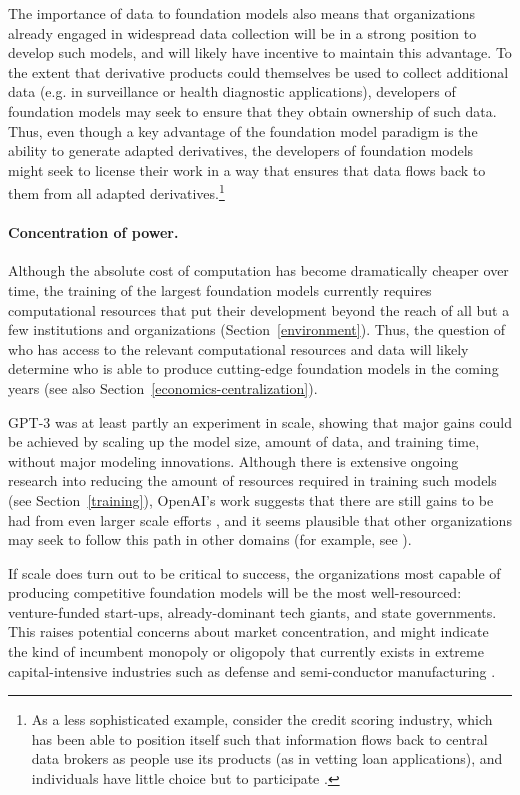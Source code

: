 The importance of data to foundation models also means that organizations already engaged in widespread data collection will be in a strong position to develop such models, and will likely have incentive to maintain this advantage. To the extent that derivative products could themselves be used to collect additional data (e.g. in surveillance or health diagnostic applications), developers of foundation models may seek to ensure that they obtain ownership of such data. Thus, even though a key advantage of the foundation model paradigm is the ability to generate adapted derivatives, the developers of foundation models might seek to license their work in a way that ensures that data flows back to them from all adapted derivatives.\footnote{As a less sophisticated example, consider the credit scoring industry, which has been able to position itself such that information flows back to central data brokers as people use its products (as in vetting loan applications), and individuals have little choice but to participate \citep{lauer.2017}.}

\paragraph{Concentration of power.} 

Although the absolute cost of computation has become dramatically cheaper over time, the training of the largest foundation models currently requires computational resources that put their development beyond the reach of all but a few institutions and organizations (Section~\ref{environment}). Thus, the question of who has access to the relevant computational resources and data will likely determine who is able to produce cutting-edge foundation models in the coming years (see also Section~\ref{economics-centralization}).

GPT-3 was at least partly an experiment in scale, showing that major gains could be achieved by scaling up the model size, amount of data, and training time, without major modeling innovations. Although there is extensive ongoing research into reducing the amount of resources required in training such models (see Section~\ref{training}), OpenAI's work suggests that there are still gains to be had from even larger scale efforts \citep{kaplan2020}, and it seems plausible that other organizations may seek to follow this path in other domains (for example, see \citep{jurassic1}).

If scale does turn out to be critical to success, the organizations most capable of producing competitive foundation models will be the most well-resourced:  venture-funded start-ups, already-dominant tech giants, and state governments.  This raises potential concerns about market concentration, and might indicate the kind of incumbent monopoly or oligopoly that currently exists in extreme capital-intensive industries such as defense and semi-conductor manufacturing \citep{carril.2020}.

